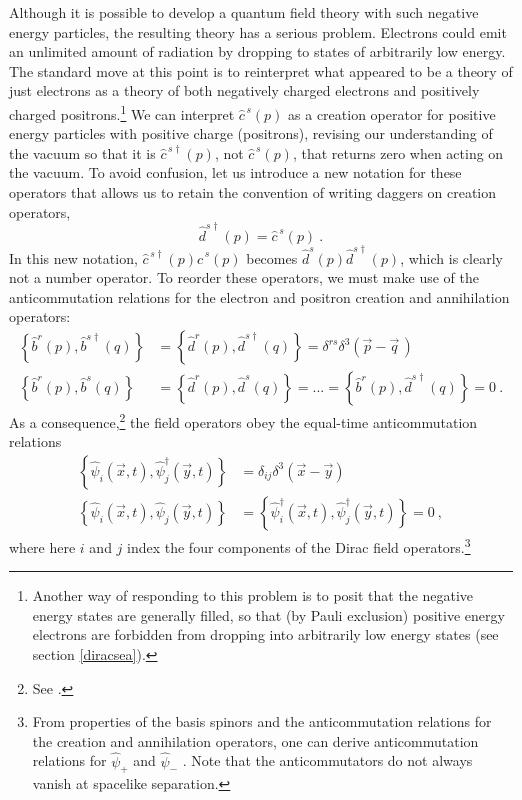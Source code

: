 \documentclass[12pt,secnumarabic,amsmath,amssymb,balancelastpage,nofootinbib]{article}
\begin{document}
Although it is possible to develop a quantum field theory with such negative energy particles, the resulting theory has a serious problem.  Electrons could emit an unlimited amount of radiation by dropping to states of arbitrarily low energy.  The standard move at this point is to reinterpret what appeared to be a theory of just electrons as a theory of both negatively charged electrons and positively charged positrons.\footnote{Another way of responding to this problem is to posit that the negative energy states are generally filled, so that (by Pauli exclusion) positive energy electrons are forbidden from dropping into arbitrarily low energy states (see section \ref{diracsea}).}  We can interpret $\widehat{c}^{\,s}(p)$ as a creation operator for positive energy particles with positive charge (positrons), revising our understanding of the vacuum so that it is  $\widehat{c}^{\,s\dagger}(p)$, not $\widehat{c}^{\,s}(p)$, that returns zero when acting on the vacuum.  To avoid confusion, let us introduce a new notation for these operators that allows us to retain the convention of writing daggers on creation operators,
\begin{equation}
\widehat{d}^{s\dagger}(p)=\widehat{c}^{\,s}(p)
\ .
\label{operatorswap}
\end{equation}
In this new notation, $\widehat{c}^{\,s\dagger}(p)\widehat{c}^{\,s}(p)$ becomes $\widehat{d}^{s}(p)\widehat{d}^{s\dagger}(p)$, which is clearly not a number operator.  To reorder these operators, we must make use of the anticommutation relations for the electron and positron creation and annihilation operators:
\begin{align}
\left\{\widehat{b}^{r}(p),\widehat{b}^{s \dagger}(q)\right\}&=\left\{\widehat{d}^{r}(p),\widehat{d}^{s \dagger}(q)\right\}= \delta^{rs}\delta^3(\vec{p}-\vec{q}\,)
\nonumber
\\
\left\{\widehat{b}^{r}(p),\widehat{b}^{s}(q)\right\}&=\left\{\widehat{d}^{r}(p),\widehat{d}^{s}(q)\right\}=...=\left\{\widehat{b}^{r}(p),\widehat{d}^{s \dagger}(q)\right\}=0
\ .
\label{anticommutation}
\end{align}
As a consequence,\footnote{See \citet[pg.\ 140]{ryder}.} the field operators obey the equal-time anticommutation relations
\begin{align}
\left\{\widehat{\psi}_i(\vec{x},t),\widehat{\psi}^{\dagger}_j(\vec{y},t)\right\}&= \delta_{ij}\delta^3 (\vec{x}-\vec{y})
\nonumber
\\
\left\{\widehat{\psi}_i(\vec{x},t),\widehat{\psi}_j(\vec{y},t)\right\}&=
\left\{\widehat{\psi}^{\dagger}_i(\vec{x},t),\widehat{\psi}^{\dagger}_j(\vec{y},t)\right\}=0
\ ,
\label{fieldanticommutation}
\end{align}
where here $i$ and $j$ index the four components of the Dirac field operators.\footnote{From properties of the basis spinors and the anticommutation relations for the creation and annihilation operators, one can derive anticommutation relations for $\widehat{\psi}_+$ and $\widehat{\psi}_-$ \citep[sec.\ 8b]{schweberQFT}.  Note that the anticommutators do not always vanish at spacelike separation.\label{anticommutationfootnote}}
\end{document}
